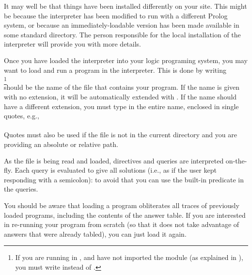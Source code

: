 It may well be that things have been installed differently on your site.
This might be because the interpreter has been modified to run with a
different Prolog system, or because an immediately-loadable version has been
made available in some standard directory. The person responsible for the
local installation of the interpreter will provide you with more details.


%

Once you have loaded the interpreter into your logic programing system, you
may want to load and run a program in the interpreter. This is done by
writing\\
\ind{}%
\footnote{
  If you are running in \Eclipse{}, and have not imported the module 
  (as explained in ), you must write 
  instead of .
}\\
 should be the name of the file that contains your program.
If the name is given with no extension, it will be automatically extended
with .%
%
If the name should have a different extension, you must type in the entire
name, enclosed in single quotes, e.g.,\\
\ind{}\\
Quotes must also be used if the file is not in the current directory and you
are providing an absolute or relative path.

As the file is being read and loaded, directives and queries are interpreted
on-the-fly. Each query is evaluated to give all solutions (i.e., as if the
user kept responding with a semicolon): to avoid that you can use the
built-in predicate  in the queries.

You should be aware that loading a program obliterates all traces of
previously loaded programs, including the contents of the answer table.  If
you are interested in re-running your program from scratch (so that it does
not take advantage of answers that were already tabled), you can just load it
again.




